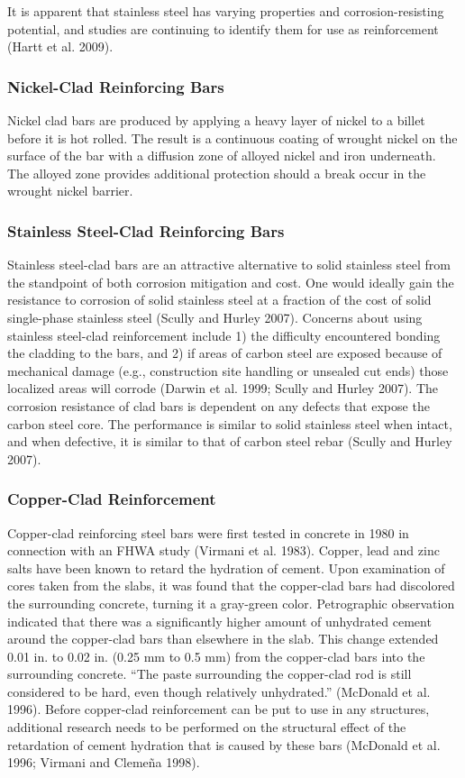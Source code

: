 It is apparent that stainless steel has varying properties and corrosion-resisting potential, and studies are continuing to identify them for use as reinforcement (Hartt et al. 2009).

\subsubsection{Nickel-Clad Reinforcing Bars}
Nickel clad bars are produced by applying a heavy layer of nickel to a billet before it is hot rolled. The result is a
continuous coating of wrought nickel on the surface of the bar with a diffusion zone of alloyed nickel and iron
underneath. The alloyed zone provides additional protection should a break occur in the wrought nickel barrier.

\subsubsection{Stainless Steel-Clad Reinforcing Bars}
Stainless steel-clad bars are an attractive alternative to solid stainless steel from the standpoint of both corrosion
mitigation and cost. One would ideally gain the resistance to corrosion of solid stainless steel at a fraction of the cost
of solid single-phase stainless steel (Scully and Hurley 2007). Concerns about using stainless steel-clad
reinforcement include 1) the difficulty encountered bonding the cladding to the bars, and 2) if areas of carbon steel
are exposed because of mechanical damage (e.g., construction site handling or unsealed cut ends) those localized
areas will corrode (Darwin et al. 1999; Scully and Hurley 2007). The corrosion resistance of clad bars is dependent
on any defects that expose the carbon steel core. The performance is similar to solid stainless steel when intact, and
when defective, it is similar to that of carbon steel rebar (Scully and Hurley 2007).


\subsubsection{Copper-Clad Reinforcement}
Copper-clad reinforcing steel bars were first tested in concrete in 1980 in connection with an FHWA study
(Virmani et al. 1983). Copper, lead and zinc salts have been known to retard the hydration of cement. Upon
examination of cores taken from the slabs, it was found that the copper-clad bars had discolored the surrounding
concrete, turning it a gray-green color. Petrographic observation indicated that there was a significantly higher
amount of unhydrated cement around the copper-clad bars than elsewhere in the slab. This change extended 0.01 in.
to 0.02 in. (0.25 mm to 0.5 mm) from the copper-clad bars into the surrounding concrete. “The paste surrounding the
copper-clad rod is still considered to be hard, even though relatively unhydrated.” (McDonald et al. 1996). Before
copper-clad reinforcement can be put to use in any structures, additional research needs to be performed on the structural effect of the retardation of cement hydration that is caused by these bars (McDonald et al. 1996; Virmani
and Clemeña 1998).

